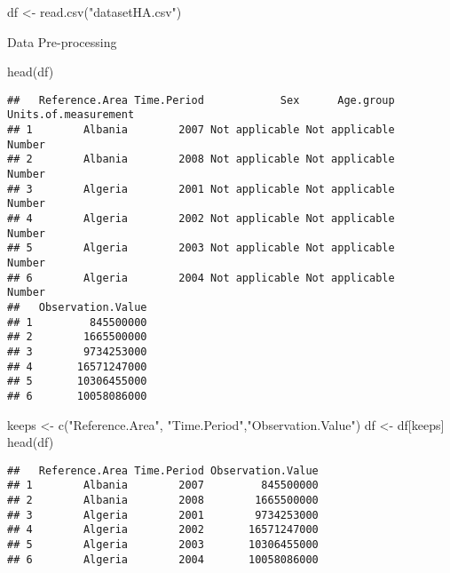 \documentclass[
]{article}
\author{}
\date{\vspace{-2.5em}}
\newenvironment{Shaded}{\begin{snugshade}}{\end{snugshade}}
\newcommand{\FunctionTok}[1]{\textcolor[rgb]{0.00,0.00,0.00}{#1}}
\newcommand{\NormalTok}[1]{#1}
\newcommand{\OtherTok}[1]{\textcolor[rgb]{0.56,0.35,0.01}{#1}}
\newcommand{\StringTok}[1]{\textcolor[rgb]{0.31,0.60,0.02}{#1}}
\begin{document}
\begin{Shaded}
\begin{Highlighting}[]
\NormalTok{df }\OtherTok{\textless{}{-}} \FunctionTok{read.csv}\NormalTok{(}\StringTok{"datasetHA.csv"}\NormalTok{)}
\end{Highlighting}
\end{Shaded}

Data Pre-processing

\begin{Shaded}
\begin{Highlighting}[]
\FunctionTok{head}\NormalTok{(df)}
\end{Highlighting}
\end{Shaded}

\begin{verbatim}
##   Reference.Area Time.Period            Sex      Age.group Units.of.measurement
## 1        Albania        2007 Not applicable Not applicable               Number
## 2        Albania        2008 Not applicable Not applicable               Number
## 3        Algeria        2001 Not applicable Not applicable               Number
## 4        Algeria        2002 Not applicable Not applicable               Number
## 5        Algeria        2003 Not applicable Not applicable               Number
## 6        Algeria        2004 Not applicable Not applicable               Number
##   Observation.Value
## 1         845500000
## 2        1665500000
## 3        9734253000
## 4       16571247000
## 5       10306455000
## 6       10058086000
\end{verbatim}

\begin{Shaded}
\begin{Highlighting}[]
\NormalTok{keeps }\OtherTok{\textless{}{-}} \FunctionTok{c}\NormalTok{(}\StringTok{"Reference.Area"}\NormalTok{, }\StringTok{"Time.Period"}\NormalTok{,}\StringTok{"Observation.Value"}\NormalTok{)}
\NormalTok{df }\OtherTok{\textless{}{-}}\NormalTok{ df[keeps]}
\FunctionTok{head}\NormalTok{(df)}
\end{Highlighting}
\end{Shaded}

\begin{verbatim}
##   Reference.Area Time.Period Observation.Value
## 1        Albania        2007         845500000
## 2        Albania        2008        1665500000
## 3        Algeria        2001        9734253000
## 4        Algeria        2002       16571247000
## 5        Algeria        2003       10306455000
## 6        Algeria        2004       10058086000
\end{verbatim}
\end{document}
